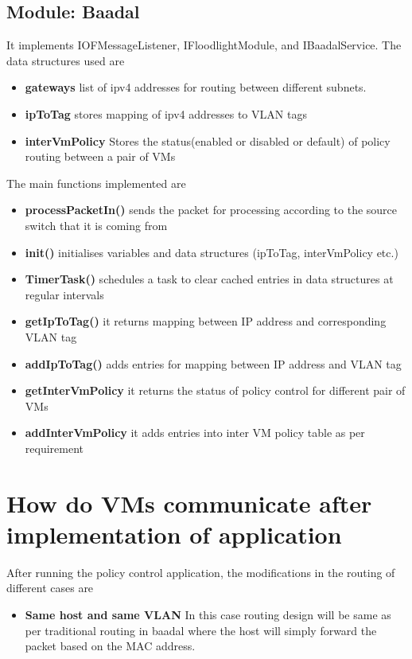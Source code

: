\subsection{Module: Baadal}
It implements IOFMessageListener, IFloodlightModule, and IBaadalService. The data structures used are
\begin{itemize}
    \item \textbf{gateways} list of ipv4 addresses for routing between different subnets.  
    \item \textbf{ipToTag} stores mapping of ipv4 addresses to VLAN tags
    \item \textbf{interVmPolicy} Stores the status(enabled or disabled or default) of policy routing between a pair of VMs
    
\end{itemize}

The main functions implemented are 

\begin{itemize}
    \item \textbf{processPacketIn()} sends the packet for processing according to the source switch that it is coming from
    \item \textbf{init()} initialises variables and data structures (ipToTag, interVmPolicy etc.)
    \item \textbf{TimerTask()} schedules a task to clear cached entries in data structures at regular intervals
    \item \textbf{getIpToTag()} it returns mapping between IP address and corresponding VLAN tag
    \item \textbf{addIpToTag()} adds entries for mapping between IP address and VLAN tag
    \item \textbf{getInterVmPolicy} it returns the status of policy control for different pair of VMs
    \item \textbf{addInterVmPolicy} it adds entries into inter VM policy table as per requirement
    
\end{itemize}

\section{How do VMs communicate after implementation of application}

After running the policy control application, the modifications in the routing of different cases are  


\begin{itemize}
    \item \textbf{Same host and same VLAN} In this case routing design will be same as per traditional routing in baadal where the host will simply forward the packet based on the MAC address.
\end{itemize}


